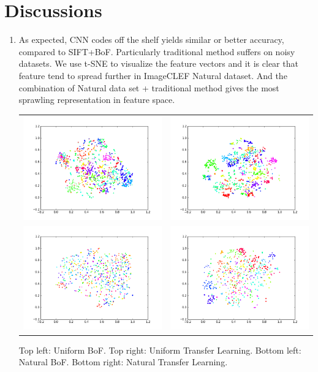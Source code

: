\documentclass[journal, 10pt]{IEEEtran}
\begin{document}
\section{Discussions}
\begin{enumerate}
  \item As expected, CNN codes off the shelf yields similar or better accuracy, compared to SIFT+BoF. Particularly traditional method suffers on noisy datasets.  We use t-SNE \cite{tSNE} to visualize the feature vectors and it is clear that feature tend to spread further in ImageCLEF Natural dataset. And the combination of Natural data set + traditional method gives the most sprawling representation in feature space.
  \begin{tabular}{c@{}c@{}}
  {\includegraphics[width=0.50\linewidth]{tsne_uniform_bof}}  &
  {\includegraphics[width=0.50\linewidth]{tsne_uniform_tl}} \\
  {\includegraphics[width=0.50\linewidth]{tsne_natural_bof}}  &
  {\includegraphics[width=0.50\linewidth]{tsne_natural_tl}} \\
  \end{tabular}
  {\tiny Top left: Uniform BoF. Top right: Uniform Transfer Learning. Bottom left: Natural BoF. Bottom right: Natural Transfer Learning.}


\end{enumerate}
\end{document}

